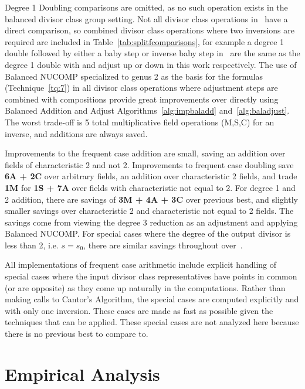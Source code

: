 Degree 1 Doubling comparisons are omitted, as no such operation exists in the
balanced divisor class group setting. Not all divisor class operations
in~\cite{EricksonJacobsonStein_realg2_2011} have a direct comparison, so
combined divisor class operations where two inversions are required are included
in Table~\ref{tab:splitfcomparisons}, for example a degree 1 double followed by
either a baby step or inverse baby step
in~\cite{EricksonJacobsonStein_realg2_2011} are the same as the degree 1 double
with and adjust up or down in this work respectively. The use of Balanced NUCOMP
specialized to genus 2 as the basis for the formulas (Technique~\ref{tq:7}) in
all divisor class operations where adjustment steps are combined with
compositions provide great improvements over directly using Balanced Addition
and Adjust Algorithms~\ref{alg:impbaladd} and~\ref{alg:baladjust}. The worst
trade-off is 5 total multiplicative field operations (M,S,C) for an inverse, and
additions are always saved.

Improvements to the frequent case addition are small, saving an addition over
fields of characteristic 2 and not 2. Improvements to frequent case doubling save
\textbf{6A + 2C} over arbitrary fields, an addition over characteristic 2
fields, and trade \textbf{1M} for \textbf{1S + 7A} over fields with
characteristic not equal to 2. For degree 1 and 2 addition, there are
savings of \textbf{3M + 4A + 3C} over previous best, and slightly smaller
savings over characteristic 2 and characteristic not equal to 2 fields. The savings
come from viewing the degree 3 reduction as an adjustment and applying Balanced
NUCOMP. For special cases where the degree of the output divisor is less than 2,
i.e. $s = s_0$, there are similar savings throughout
over~\cite{EricksonJacobsonStein_realg2_2011}. 

All implementations of frequent case arithmetic include explicit handling of
special cases where the input divisor class representatives have points in
common (or are opposite) as they come up naturally in the computations. Rather
than making calls to Cantor's Algorithm, the special cases are computed
explicitly and with only one inversion. These cases are made as fast as possible
given the techniques that can be applied. These special cases are not analyzed
here because there is no previous best to compare to.


\section{Empirical Analysis}
\label{sec:g2numerical}


